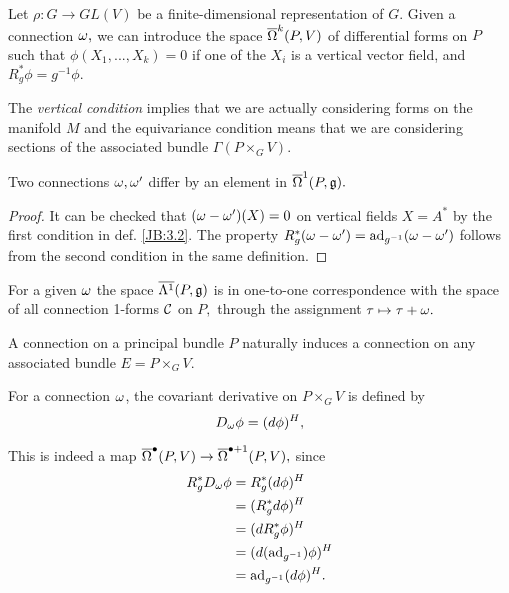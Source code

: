 \begin{defn}[\cite{DB}, 3.1.2]
\label{JB:4.4}
 Let $\rho: G \to GL(V)$ be a finite-dimensional representation of $G.$ Given a connection $\omega,$ we can introduce the
space $ \overline{\Omega}^{k}(P, V)$ of differential forms on $P$ such that $\phi(X_{1}, ..., X_{k})=0$ if one of the $X_{i}$ is a
vertical vector field, and $R^{*}_{g}\phi=g^{-1}\phi.$ 
\end{defn}

The \emph{vertical condition} implies that we are actually considering forms on the manifold $M$ and the equivariance
condition means that we are considering sections of the associated bundle $\Gamma(P \times_{G} V).$

\begin{prop}
 \label{JB:4.5}
Two connections $\omega, \omega^\prime$ differ by an element in $\overline{\Omega}^{1}(P, \mathfrak{g}).$
\end{prop}
\begin{proof}
 It can be checked that $(\omega-\omega^\prime)(X)=0$ on vertical fields $X=A^{*}$ by the first condition in def.
\ref{JB:3.2}. The property $R_{g}^{*}(\omega-\omega^\prime)=\operatorname{ad}_{g^{-1}}(\omega-{\omega}^{\prime})$ follows from the second
condition in the same definition.
\end{proof}

\begin{cor}
\label{JB:4.6}
 For a given $\omega$ the space $\overline{\Lambda^{1}}(P, \mathfrak{g})$ is in one-to-one correspondence with the space of all
connection 1-forms $\mathcal{C}$ on $P,$ through the assignment $\tau \mapsto \tau + \omega.$
\end{cor}

A connection on a principal bundle $P$ naturally induces a connection on any associated bundle $E=P\times_{G} V.$

\begin{defn}[\cite{DB}, 3.1.3]
\label{JB:4.7}
For a connection $\omega$, the covariant derivative on $P \times_{G} V$ is defined by
$$
D_{\omega}\phi = (d\phi)^{H},
$$
\end{defn}

This is indeed a map $\overline{\Omega}^{\bullet}(P, V) \to \overline{\Omega}^{\bullet + 1}(P, V),$ since
\begin{align*}
R^{*}_{g} D_{\omega} \phi &= R_{g}^{*}(d\phi)^{H} \\
&=(R_{g}^{*}d\phi)^{H} \\
&=(dR_{g}^{*}\phi)^{H} \\
&=(d(\operatorname{ad}_{g^{-1}})\phi)^{H} \\
&=\operatorname{ad}_{g^{-1}}(d\phi)^{H}.
\end{align*}

